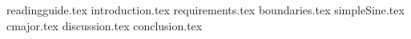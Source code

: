 

{readingguide.tex}
{introduction.tex}
{requirements.tex}
{boundaries.tex}
{simpleSine.tex}
{cmajor.tex}
{discussion.tex}
{conclusion.tex}

%
